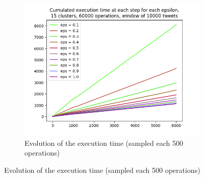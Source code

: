 \documentclass[a4paper,10pt]{article}
\begin{document}
\begin{appendices}
\begin{figure}[h]
\begin{subfigure}[b]{0.3\textwidth}
		\includegraphics[width=\textwidth]{pictures/cumulated_execution_times_15_60000_10000.png}
		\caption{Evolution of the execution time (sampled each 500 operations)}
	\end{subfigure}
	

\end{figure}
\end{appendices}
\end{document}
